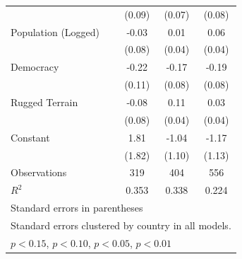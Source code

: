 \documentclass[12pt, letterpaper]{article}
\begin{document}
\begin{table}[htbp]
\begin{small}
\begin{tabular}{l*{3}{c}}
                    &      (0.09)         &      (0.07)         &      (0.08)         \\
Population (Logged) &       -0.03         &        0.01         &        0.06\sym{+}  \\
                    &      (0.08)         &      (0.04)         &      (0.04)         \\
Democracy           &       -0.22\sym{*}  &       -0.17\sym{**} &       -0.19\sym{**} \\
                    &      (0.11)         &      (0.08)         &      (0.08)         \\
Rugged Terrain      &       -0.08         &        0.11\sym{**} &        0.03         \\
                    &      (0.08)         &      (0.04)         &      (0.04)         \\
Constant            &        1.81         &       -1.04         &       -1.17         \\
                    &      (1.82)         &      (1.10)         &      (1.13)         \\
\hline
Observations        &         319         &         404         &         556         \\
\(R^{2}\)           &       0.353         &       0.338         &       0.224         \\
\hline\hline
\multicolumn{4}{l}{\footnotesize Standard errors in parentheses}\\
\multicolumn{4}{l}{\footnotesize Standard errors clustered by country in all models.}\\
\multicolumn{4}{l}{\footnotesize \sym{+} \(p<0.15\), \sym{*} \(p<0.10\), \sym{**} \(p<0.05\), \sym{***} \(p<0.01\)}\\
\end{tabular}
\end{small}
\end{table}
\end{document}
